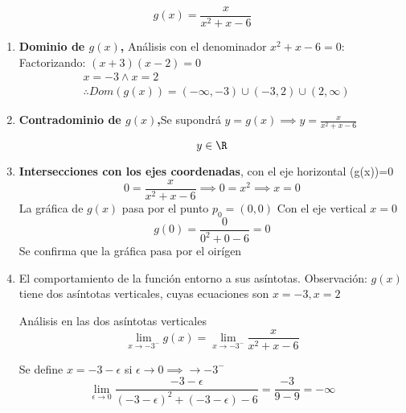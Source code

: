 \begin{example}
	\begin{equation*}
		g(x)=\frac{x}{x^2+x-6}
	\end{equation*}

	\begin{enumerate}
		\item \textbf{Dominio de $g(x)$,} Análisis con el denominador $x^2+x-6=0$:
		      Factorizando: $\left(x+3 \right) \left(x-2 \right)=0$
		      \begin{align*}
			       & x=-3 \land x=2                                                                                   \\
			       & \therefore Dom(g(x))=\left(-\infty,-3 \right)\cup \left(-3,2 \right) \cup \left(2,\infty \right)
		      \end{align*}

		\item \textbf{Contradominio de $g(x)$,}Se supondrá $y=g(x)\implies y=\frac{x}{x^2+x-6}$

		      \begin{equation*}
			      y\in \R
		      \end{equation*}

		\item \textbf{Intersecciones con los ejes coordenadas}, con el eje horizontal (g(x))=0
		      \begin{equation*}
			      0=\frac{x}{x^2+x-6}\implies 0=x^2\implies x=0
		      \end{equation*}
		      La gráfica de $g(x)$ pasa por el punto $p_{0}=(0,0)$
		      Con el eje vertical $x=0$
		      \begin{equation*}
			      g(0)=\frac{0}{0^2+0-6}=0
		      \end{equation*}
		      Se confirma que la gráfica pasa por el oirígen

		\item El comportamiento de la función entorno a sus asíntotas. Observación:
		      $g(x)$ tiene dos asíntotas verticales, cuyas ecuaciones son $x=-3,x=2$

		      Análisis en las dos asíntotas verticales
		      \begin{equation*}
			      \lim_{x \to -3^-} g(x)=\lim_{x \to -3^-}\frac{x}{x^2+x-6}
		      \end{equation*}

		      Se define $x=-3-\epsilon$ si $\epsilon\to 0\implies \to -3^-$
		      \begin{equation*}
			      \lim_{\epsilon \to 0} \frac{-3-\epsilon}{\left(-3-\epsilon\right)^2+\left(-3-\epsilon\right)-6}=\frac{-3}{9-9}=-\infty
		      \end{equation*}


\end{enumerate}
\end{example}
